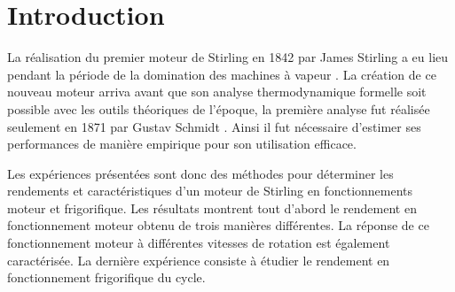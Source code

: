 \section{Introduction}
La réalisation du premier moteur de Stirling en 1842 par James Stirling a eu lieu pendant la période de la domination des machines à vapeur \cite{histoire-stir}. La création de ce nouveau moteur arriva avant que son analyse thermodynamique formelle soit possible avec les outils théoriques de l'époque, la première analyse fut réalisée seulement en 1871 par Gustav Schmidt \cite{histoire-schmidt}. Ainsi il fut nécessaire d'estimer ses performances de manière empirique pour son utilisation efficace.

Les expériences présentées sont donc des méthodes pour déterminer les rendements et caractéristiques d'un moteur de Stirling en fonctionnements moteur et frigorifique. Les résultats montrent tout d'abord le rendement en fonctionnement moteur obtenu de trois manières différentes. La réponse de ce fonctionnement moteur à différentes vitesses de rotation est également caractérisée. La dernière expérience consiste à étudier le rendement en fonctionnement frigorifique du cycle.